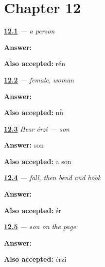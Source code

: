 \section*{Chapter 12}

\noindent\begin{minipage}[t]{\linewidth}
\raggedright
\hyperlink{review-ZH-C12-ren-meaning}{\textbf{12.1}} \emph{ — a person}\par
\small \textbf{Answer:} \par
\footnotesize \textbf{Also accepted:}  rén
\end{minipage}\par\medskip

\noindent\begin{minipage}[t]{\linewidth}
\raggedright
\hyperlink{review-ZH-C12-nu-meaning}{\textbf{12.2}} \emph{ — female, woman}\par
\small \textbf{Answer:} \par
\footnotesize \textbf{Also accepted:}  nǚ
\end{minipage}\par\medskip

\noindent\begin{minipage}[t]{\linewidth}
\raggedright
\hyperlink{review-ZH-C12-hear-erzi-meaning}{\textbf{12.3}} \emph{Hear \emph{érzi} — son}\par
\small \textbf{Answer:} son\par
\footnotesize \textbf{Also accepted:} a son
\end{minipage}\par\medskip

\noindent\begin{minipage}[t]{\linewidth}
\raggedright
\hyperlink{review-ZH-W12-er-write}{\textbf{12.4}} \emph{ — fall, then bend and hook}\par
\small \textbf{Answer:} \par
\footnotesize \textbf{Also accepted:}  ér
\end{minipage}\par\medskip

\noindent\begin{minipage}[t]{\linewidth}
\raggedright
\hyperlink{review-ZH-C12-erzi-write}{\textbf{12.5}} \emph{ — son on the page}\par
\small \textbf{Answer:} \par
\footnotesize \textbf{Also accepted:}  érzi
\end{minipage}\par\medskip

